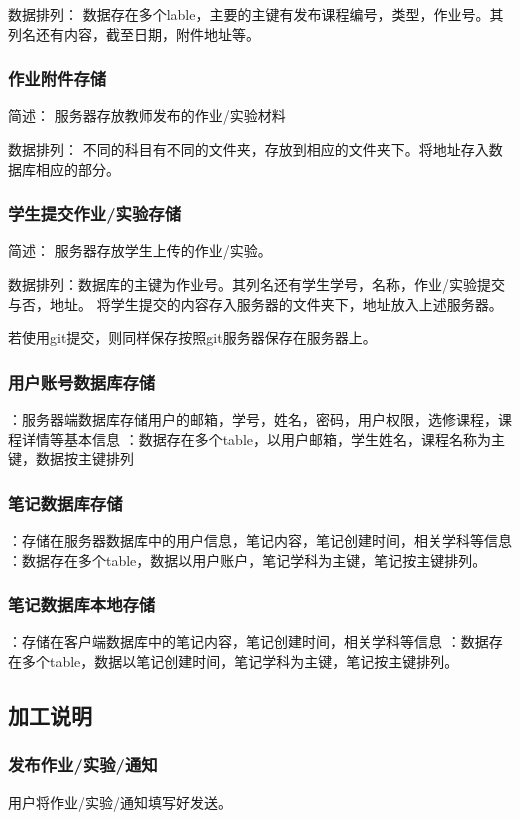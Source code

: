 数据排列： 数据存在多个lable，主要的主键有发布课程编号，类型，作业号。其列名还有内容，截至日期，附件地址等。

\subsubsection{作业附件存储}
简述： 服务器存放教师发布的作业/实验材料

数据排列： 不同的科目有不同的文件夹，存放到相应的文件夹下。将地址存入数据库相应的部分。

\subsubsection{学生提交作业/实验存储}
简述： 服务器存放学生上传的作业/实验。

数据排列：数据库的主键为作业号。其列名还有学生学号，名称，作业/实验提交与否，地址。
将学生提交的内容存入服务器的文件夹下，地址放入上述服务器。

若使用git提交，则同样保存按照git服务器保存在服务器上。

\subsubsection{用户账号数据库存储}
：服务器端数据库存储用户的邮箱，学号，姓名，密码，用户权限，选修课程，课程详情等基本信息
：数据存在多个table，以用户邮箱，学生姓名，课程名称为主键，数据按主键排列

\subsubsection{笔记数据库存储}
：存储在服务器数据库中的用户信息，笔记内容，笔记创建时间，相关学科等信息
：数据存在多个table，数据以用户账户，笔记学科为主键，笔记按主键排列。

\subsubsection{笔记数据库本地存储}
：存储在客户端数据库中的笔记内容，笔记创建时间，相关学科等信息
：数据存在多个table，数据以笔记创建时间，笔记学科为主键，笔记按主键排列。

\subsection{加工说明}
\subsubsection{发布作业/实验/通知}
用户将作业/实验/通知填写好发送。

